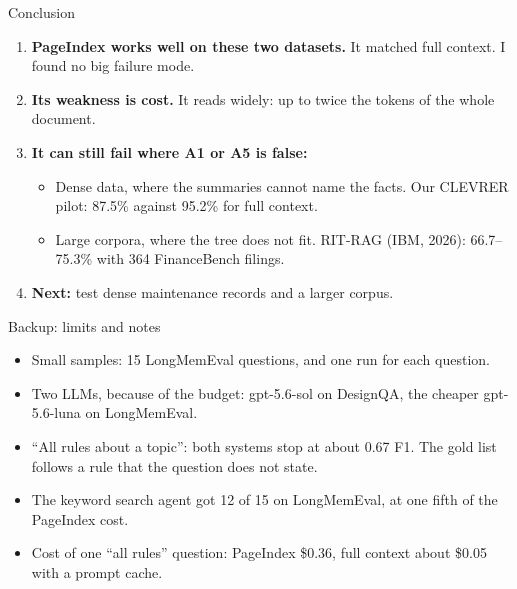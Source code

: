 \documentclass[aspectratio=169,11pt]{beamer}
\begin{document}
\begin{frame}{Conclusion}
  \vspace{0.20cm}
  {\fontsize{11.5}{15}\selectfont
  \begin{enumerate}\setlength{\itemsep}{7pt}
    \item \textbf{PageIndex works well on these two datasets.} It matched full context. I found no big failure mode.
    \item \textbf{Its weakness is cost.} It reads widely: up to twice the tokens of the whole document.
    \item \textbf{It can still fail where A1 or A5 is false:}
      {\fontsize{10.5}{13.5}\selectfont
      \begin{itemize}\setlength{\itemsep}{2pt}
        \item Dense data, where the summaries cannot name the facts. Our CLEVRER pilot: 87.5\% against 95.2\% for full context.
        \item Large corpora, where the tree does not fit. RIT-RAG (IBM, 2026): 66.7--75.3\% with 364 FinanceBench filings.
      \end{itemize}}
    \item \textbf{Next:} test dense maintenance records and a larger corpus.
  \end{enumerate}\par}
\end{frame}

\begin{frame}{Backup: limits and notes}
  \vspace{0.20cm}
  {\fontsize{10.5}{14}\selectfont
  \begin{itemize}\setlength{\itemsep}{5pt}
    \item Small samples: 15 LongMemEval questions, and one run for each question.
    \item Two LLMs, because of the budget: gpt-5.6-sol on DesignQA, the cheaper gpt-5.6-luna on LongMemEval.
    \item ``All rules about a topic'': both systems stop at about 0.67 F1. The gold list follows a rule that the question does not state.
    \item The keyword search agent got 12 of 15 on LongMemEval, at one fifth of the PageIndex cost.
    \item Cost of one ``all rules'' question: PageIndex \$0.36, full context about \$0.05 with a prompt cache.
  \end{itemize}}
\end{frame}
\end{document}
